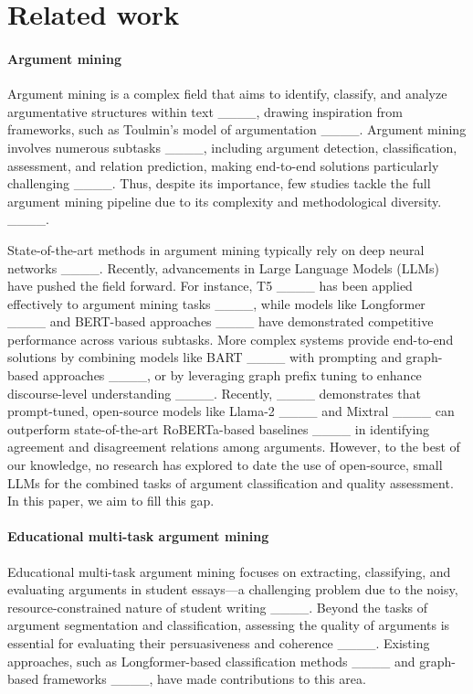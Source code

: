 \section{Related work}
\label{sec:litreview}
    \paragraph{Argument mining}%
    Argument mining is a complex field that aims to identify, classify, and analyze argumentative structures within text ____, drawing inspiration from frameworks, such as Toulmin's model of argumentation ____. Argument mining involves numerous subtasks ____, including argument detection, classification, assessment, and relation prediction, making end-to-end solutions particularly challenging ____. Thus, despite its importance, few studies tackle the full argument mining pipeline due to its complexity and methodological diversity. ____.

     State-of-the-art methods in argument mining typically rely on deep neural networks ____. Recently, advancements in Large Language Models (LLMs) have pushed the field forward. For instance, T5 ____ has been applied effectively to argument mining tasks ____, while models like Longformer ____ and BERT-based approaches ____ have demonstrated competitive performance across various subtasks. More complex systems provide end-to-end solutions by combining models like BART ____ with prompting and graph-based approaches ____, or by leveraging graph prefix tuning to enhance discourse-level understanding ____. Recently, ____ demonstrates that prompt-tuned, open-source models like Llama-2 ____ and Mixtral ____ can outperform state-of-the-art RoBERTa-based baselines ____ in identifying agreement and disagreement relations among arguments. However, to the best of our knowledge, no research has explored to date the use of open-source, small LLMs for the combined tasks of argument classification and quality assessment. In this paper, we aim to fill this gap. 
    
   \paragraph{Educational multi-task argument mining}%
   Educational multi-task argument mining focuses on extracting, classifying, and evaluating arguments in student essays—a challenging problem due to the noisy, resource-constrained nature of student writing ____. Beyond the tasks of argument segmentation and classification, assessing the quality of arguments is essential for evaluating their persuasiveness and coherence ____. Existing approaches, such as Longformer-based classification methods ____ and graph-based frameworks ____, have made contributions to this area. 

